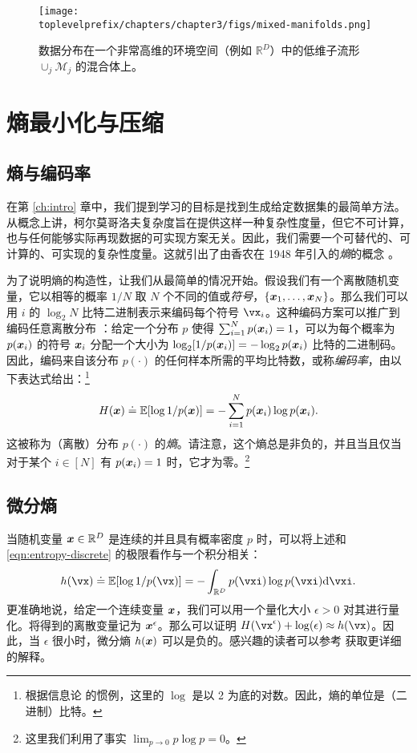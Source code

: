 \documentclass[../../book-main_zh.tex]{subfiles}
\begin{document}
\begin{figure}
    \centering
    \texttt{[image: \\toplevelprefix/chapters/chapter3/figs/mixed-manifolds.png]}
    \caption{数据分布在一个非常高维的环境空间（例如 $\mathbb{R}^D$）中的低维子流形 $\cup_j \mathcal{M}_j$ 的混合体上。}
    \label{fig:mixture-manifolds}
\end{figure}


\section{熵最小化与压缩}

\subsection{熵与编码率}
在第 \ref{ch:intro} 章中，我们提到学习的目标是找到生成给定数据集的最简单方法。从概念上讲，柯尔莫哥洛夫复杂度旨在提供这样一种复杂性度量，但它不可计算，也与任何能够实际再现数据的可实现方案无关。因此，我们需要一个可替代的、可计算的、可实现的复杂性度量。这就引出了由香农在 1948 年引入的{\em 熵}的概念 \cite{Shannon-1948}。

为了说明熵的构造性，让我们从最简单的情况开始。假设我们有一个离散随机变量，它以相等的概率 $1/N$ 取 $N$ 个不同的值或\textit{符号}，$\{\bm{x}_1, \ldots, \bm{x}_N\}$。那么我们可以用 $i$ 的 $\log_2 N$ 比特二进制表示来编码每个符号 \(\vx_{i}\)。这种编码方案可以推广到编码任意离散分布 \cite{Cover-Thomas}：给定一个分布 \(p\) 使得 $\sum_{i=1}^N p(\bm{x}_i) = 1$，可以为每个概率为 $p(\bm{x}_i)$ 的符号 $\bm{x}_i$ 分配一个大小为 $\log_2 [1/p(\bm{x}_i)] = - \log_2 p(\bm{x}_i)$ 比特的二进制码。因此，编码来自该分布 $p(\cdot)$ 的任何样本所需的平均比特数，或称{\em 编码率}，由以下表达式给出：\footnote{根据信息论 \cite{Cover-Thomas} 的惯例，这里的 $\log$ 是以 2 为底的对数。因此，熵的单位是（二进制）比特。}
\begin{equation}
	H(\bm{x}) \doteq \mathbb{E}[\log 1/p(\bm{x})]  = - \sum_{i=1}^N p(\bm{x}_i) \log  p(\bm{x}_i).
	\label{eqn:entropy-discrete}
\end{equation}
这被称为（离散）分布 $p(\cdot)$ 的{\em 熵}。请注意，这个熵总是非负的，并且当且仅当对于某个 $i \in [N]$ 有 $p(\bm{x}_i) = 1$ 时，它才为零。\footnote{这里我们利用了事实 $\lim_{p\rightarrow 0} p \log p = 0$。}


\subsection{微分熵}

当随机变量 $\bm{x} \in \mathbb{R}^{D}$ 是连续的并且具有概率密度 $p$ 时，可以将上述和 \eqref{eqn:entropy-discrete} 的极限看作与一个积分相关：
\begin{equation}
	h(\vx) \doteq \Ex[\log 1/p(\vx)] = - \int_{\R^{D}} p(\vxi) \log p(\vxi) \odif{\vxi}.
	\label{eqn:entropy-differential}
\end{equation}
{更准确地说，给定一个连续变量 $\bm{x}$，我们可以用一个量化大小 $\epsilon > 0$ 对其进行量化。将得到的离散变量记为 $\bm{x}^\epsilon$。那么可以证明 $H(\vx^\epsilon) + \log(\epsilon) \approx h(\vx)$。因此，当 $\epsilon$ 很小时，微分熵 $h(\bm{x})$ 可以是负的。感兴趣的读者可以参考 \cite{Cover-Thomas} 获取更详细的解释。}
\end{document}
